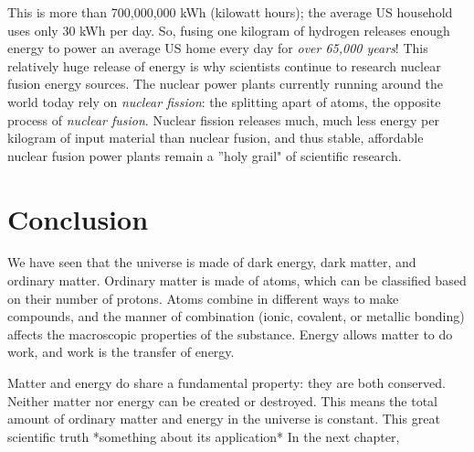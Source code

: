 This is more than 700,000,000 kWh (kilowatt hours); the average US household 
uses only 30 kWh per day. So, fusing one kilogram of hydrogen releases enough energy 
to power an average US home every day for \textit{over 65,000 years}! This 
relatively huge release of energy is why scientists continue to research nuclear 
fusion energy sources. The nuclear power plants currently running around the world 
today rely on \textit{nuclear fission}: the splitting apart of atoms, the opposite 
process of \textit{nuclear fusion}. Nuclear fission releases much, much less energy 
per kilogram of input material than nuclear fusion, and thus stable, affordable 
nuclear fusion power plants remain a ''holy grail" of scientific research. 

\section{Conclusion}
We have seen that the universe is made of dark energy, dark matter, and ordinary matter. Ordinary matter is made of atoms, which can be classified based on their number of protons. Atoms combine in different ways to make compounds, and the manner of combination (ionic, covalent, or metallic bonding) affects the macroscopic properties of the substance. Energy allows matter to do work, and work is the transfer of energy. 

Matter and energy do share a fundamental property: they are both conserved. Neither matter nor energy can be created or destroyed. This means the total amount of ordinary matter and energy in the universe is constant. This great scientific truth *something about its application* In the next chapter, 










